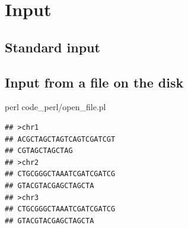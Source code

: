 \documentclass[]{book}
\makeatletter
\newenvironment{Shaded}{\begin{snugshade}}{\end{snugshade}}
\newcommand{\CharTok}[1]{\textcolor[rgb]{0.31,0.60,0.02}{#1}}
\newcommand{\DataTypeTok}[1]{\textcolor[rgb]{0.13,0.29,0.53}{#1}}
\newcommand{\FunctionTok}[1]{\textcolor[rgb]{0.00,0.00,0.00}{#1}}
\newcommand{\KeywordTok}[1]{\textcolor[rgb]{0.13,0.29,0.53}{\textbf{#1}}}
\newcommand{\NormalTok}[1]{#1}
\newcommand{\StringTok}[1]{\textcolor[rgb]{0.31,0.60,0.02}{#1}}
\newenvironment{kframe}{%
\medskip{}
\setlength{\fboxsep}{.8em}
 \def\at@end@of@kframe{}%
 \ifinner\ifhmode%
  \def\at@end@of@kframe{\end{minipage}}%
  \begin{minipage}{\columnwidth}%
 \fi\fi%
 \def\FrameCommand##1{\hskip\@totalleftmargin \hskip-\fboxsep
 \colorbox{shadecolor}{##1}\hskip-\fboxsep
     \hskip-\linewidth \hskip-\@totalleftmargin \hskip\columnwidth}%
 \MakeFramed {\advance\hsize-\width
   \@totalleftmargin\z@ \linewidth\hsize
   \@setminipage}}%
 {\par\unskip\endMakeFramed%
 \at@end@of@kframe}
\renewenvironment{Shaded}{\begin{kframe}}{\end{kframe}}
\makeatother
\begin{document}
\hypertarget{input}{%
\section{Input}\label{input}}

\hypertarget{standard-input}{%
\subsection{Standard input}\label{standard-input}}

\hypertarget{input-from-a-file-on-the-disk}{%
\subsection{Input from a file on the disk}\label{input-from-a-file-on-the-disk}}

\begin{Shaded}
\end{Shaded}

\begin{Shaded}
\begin{Highlighting}[]
\FunctionTok{perl}\NormalTok{ code_perl/open_file.pl}
\end{Highlighting}
\end{Shaded}

\begin{verbatim}
## >chr1
## ACGCTAGCTAGTCAGTCGATCGT
## CGTAGCTAGCTAG
## >chr2
## CTGCGGGCTAAATCGATCGATCG
## GTACGTACGAGCTAGCTA
## >chr3
## CTGCGGGCTAAATCGATCGATCG
## GTACGTACGAGCTAGCTA
\end{verbatim}
\end{document}
